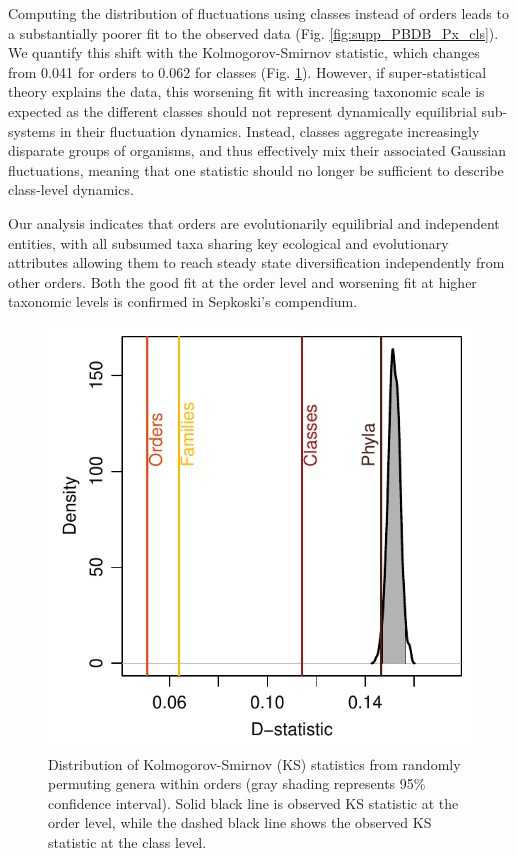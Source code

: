 \documentclass[12pt]{article}
\begin{document}
Computing the distribution of fluctuations using classes instead of
orders leads to a substantially poorer fit to the observed data
(Fig. \ref{fig:supp_PBDB_Px_cls}). We quantify this shift with the
Kolmogorov-Smirnov statistic, which changes from 0.041 for orders to
0.062 for classes (Fig. \ref{fig:dStat}). However, if
super-statistical theory explains the data, this worsening fit with
increasing taxonomic scale is expected as the different classes should
not represent dynamically equilibrial sub-systems in their fluctuation
dynamics. Instead, classes aggregate increasingly disparate groups of
organisms, and thus effectively mix their associated Gaussian
fluctuations, meaning that one statistic should no longer be
sufficient to describe class-level dynamics. 

Our analysis indicates that orders are evolutionarily equilibrial and
independent entities, with all subsumed taxa sharing key ecological
and evolutionary attributes allowing them to reach steady state
diversification independently from other orders. Both the good fit at
the order level and worsening fit at higher taxonomic levels is
confirmed in Sepkoski's compendium.

\begin{figure}[!h]
  \centering
  \includegraphics[scale=1]{../../fig_dStat.pdf}
  \caption[Goodness of super-statistical theory fit]{Distribution of
    Kolmogorov-Smirnov (KS) statistics from randomly permuting genera
    within orders (gray shading represents 95\% confidence
    interval). Solid black line is observed KS statistic at the order
    level, while the dashed black line shows the observed KS statistic
    at the class level.}
  \label{fig:dStat}
\end{figure}
\end{document}
